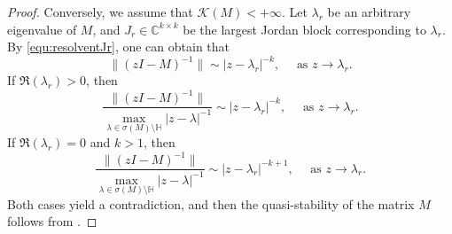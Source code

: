 \documentclass{article}
\theoremstyle{plain}%
\theoremstyle{definition}%
\theoremstyle{remark}%
\newcommand{\bC}{\mathbb{C}}
\newcommand{\bH}{\mathbb{H}}
\newcommand{\cK}{\mathcal{K}}
\newcommand{\+}[1]{{\bm{#1}}}
\newcommand{\norm}[1]{\|{#1}\|}
\begin{document}
\begin{proof}
  Conversely, we assume that $\cK(M) < + \infty$. Let $\lambda_r$ be 
  an arbitrary eigenvalue of $M$, and $J_r \in \bC^{k \times k}$ be 
  the largest Jordan block corresponding to $\lambda_r$. By 
  \cref{equ:resolventJr}, one can obtain that 
  \begin{displaymath}
    \norm{(z I - M)^{-1}} \sim |z - \lambda_r|^{-k}, \quad 
    \text{ as } z \rightarrow \lambda_r.
  \end{displaymath}
  If $\Re(\lambda_r) > 0$, then 
  \begin{displaymath}
    \frac{\norm{(z I - M)^{-1}}}
    {\max_{\lambda \in \sigma(M) \setminus \bH} |z - \lambda|^{-1}}
    \sim |z - \lambda_r|^{-k}, \quad \text{ as } 
    z \rightarrow \lambda_r.
  \end{displaymath}
  If $\Re(\lambda_r) = 0$ and $k > 1$, then 
  \begin{displaymath}
    \frac{\norm{(z I - M)^{-1}}}
    {\max_{\lambda \in \sigma(M) \setminus \bH} |z - \lambda|^{-1}}
    \sim |z - \lambda_r|^{- k + 1}, \quad \text{ as }
    z \rightarrow \lambda_r.
  \end{displaymath}
  Both cases yield a contradiction, and then the quasi-stability of 
  the matrix $M$ follows from .
\end{proof}
\end{document}
